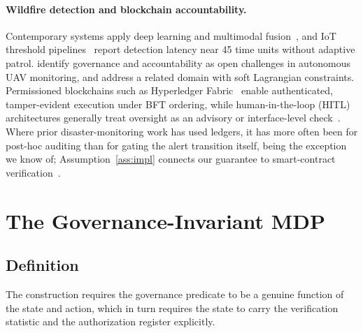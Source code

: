 \documentclass[letterpaper]{article} %
\begin{document}
\paragraph{Wildfire detection and blockchain accountability.} Contemporary systems apply deep learning and multimodal fusion~\citep{ghali2022}, and IoT threshold pipelines~\citep{tarigan2026} report detection latency near 45 time units without adaptive patrol. \citet{partheepan2023} identify governance and accountability as open challenges in autonomous UAV monitoring, and \citet{gao2024} address a related domain with soft Lagrangian constraints. Permissioned blockchains such as Hyperledger Fabric~\citep{androulaki2018} enable authenticated, tamper-evident execution under BFT ordering, while human-in-the-loop (HITL) architectures generally treat oversight as an advisory or interface-level check~\citep{holzinger2025}. Where prior disaster-monitoring work has used ledgers, it has more often been for post-hoc auditing than for gating the alert transition itself, \citet{akarma2026} being the exception we know of; Assumption~\ref{ass:impl} connects our guarantee to smart-contract verification~\citep{bhargavan2016}.

\section{The Governance-Invariant MDP}
\label{sec:gomdp}

\subsection{Definition}
\label{sec:def}

The construction requires the governance predicate to be a genuine function of the state and action, which in turn requires the state to carry the verification statistic and the authorization register explicitly.
\end{document}
